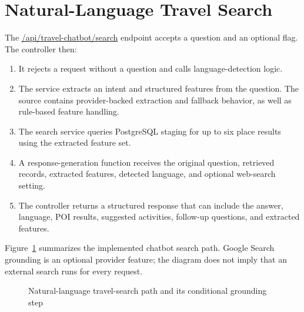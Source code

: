 \section{Natural-Language Travel Search}

The \url{/api/travel-chatbot/search} endpoint accepts a question and an optional  flag. The controller then:
\begin{enumerate}[leftmargin=1.8em,itemsep=3pt]
    \item It rejects a request without a question and calls language-detection logic.
    \item The service extracts an intent and structured features from the question. The source contains provider-backed extraction and fallback behavior, as well as rule-based feature handling.
    \item The search service queries PostgreSQL staging for up to six place results using the extracted feature set.
    \item A response-generation function receives the original question, retrieved records, extracted features, detected language, and optional web-search setting.
    \item The controller returns a structured response that can include the answer, language, POI results, suggested activities, follow-up questions, and extracted features.
\end{enumerate}

Figure~\ref{fig:chat_search_pipeline} summarizes the implemented chatbot search path. Google Search grounding is an optional provider feature; the diagram does not imply that an external search runs for every request.

\begin{figure}[htbp]
    \centering
    \caption{Natural-language travel-search path and its conditional grounding step}
    \label{fig:chat_search_pipeline}
\end{figure}

